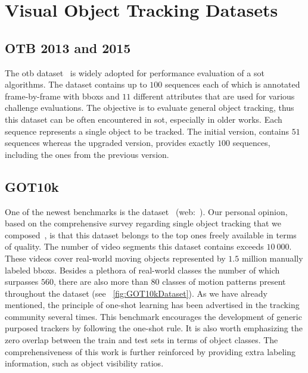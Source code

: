 \section{Visual Object Tracking Datasets}

\subsection{OTB 2013 and 2015}
\label{ssec:OTB20132015Dataset}

The \gls{otb} dataset~\cite{wu2015otb} is widely adopted for performance evaluation of a \gls{sot} algorithms. The dataset contains up to $100$ sequences each of which is annotated frame-by-frame with \glspl{bbox} and $11$ different attributes that are used for various challenge evaluations. The objective is to evaluate general object tracking, thus this dataset can be often encountered in \gls{sot}, especially in older works. Each sequence represents a single object to be tracked. The initial version, \otbthirteen{} contains $51$ sequences whereas the upgraded version, \otbfifteen{} provides exactly $100$ sequences, including the ones from the previous version.

\subsection{GOT10k}
\label{ssec:GOT10kDataset}

One of the newest benchmarks is the \gottenk{} dataset~\cite{huang2021got10k} (web:~\cite{webgot10kdataset}). Our personal opinion, based on the comprehensive survey regarding single object tracking that we composed~\cite{ondrasovic2021siamese}, is that this dataset belongs to the top ones freely available in terms of quality. The number of video segments this dataset contains exceeds $10\ 000$. These videos cover real-world moving objects represented by $1.5$ million manually labeled \glspl{bbox}. Besides a plethora of real-world classes the number of which surpasses $560$, there are also more than $80$ classes of motion patterns present throughout the dataset (see \figtext{}~\ref{fig:GOT10kDataset}).
As we have already mentioned, the principle of one-shot learning has been advertised in the tracking community several times. This benchmark encourages the development of generic purposed trackers by following the one-shot rule. It is also worth emphasizing the zero overlap between the train and test sets in terms of object classes. The comprehensiveness of this work is further reinforced by providing extra labeling information, such as object visibility ratios.

